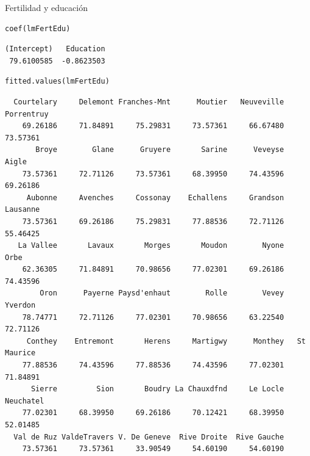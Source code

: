 \documentclass[xcolor={usenames,svgnames,dvipsnames}]{beamer}
\begin{document}
\begin{frame}[fragile,label=sec-5-2]{Fertilidad y educación}
 \lstset{language=R,label= ,caption= ,numbers=none}
\begin{lstlisting}
coef(lmFertEdu)
\end{lstlisting}

\begin{verbatim}
(Intercept)   Education 
 79.6100585  -0.8623503
\end{verbatim}

\lstset{language=R,label= ,caption= ,numbers=none}
\begin{lstlisting}
fitted.values(lmFertEdu)
\end{lstlisting}

\begin{verbatim}
  Courtelary     Delemont Franches-Mnt      Moutier   Neuveville   Porrentruy 
    69.26186     71.84891     75.29831     73.57361     66.67480     73.57361 
       Broye        Glane      Gruyere       Sarine      Veveyse        Aigle 
    73.57361     72.71126     73.57361     68.39950     74.43596     69.26186 
     Aubonne     Avenches     Cossonay    Echallens     Grandson     Lausanne 
    73.57361     69.26186     75.29831     77.88536     72.71126     55.46425 
   La Vallee       Lavaux       Morges       Moudon        Nyone         Orbe 
    62.36305     71.84891     70.98656     77.02301     69.26186     74.43596 
        Oron      Payerne Paysd'enhaut        Rolle        Vevey      Yverdon 
    78.74771     72.71126     77.02301     70.98656     63.22540     72.71126 
     Conthey    Entremont       Herens     Martigwy      Monthey   St Maurice 
    77.88536     74.43596     77.88536     74.43596     77.02301     71.84891 
      Sierre         Sion       Boudry La Chauxdfnd     Le Locle    Neuchatel 
    77.02301     68.39950     69.26186     70.12421     68.39950     52.01485 
  Val de Ruz ValdeTravers V. De Geneve  Rive Droite  Rive Gauche 
    73.57361     73.57361     33.90549     54.60190     54.60190
\end{verbatim}
\end{frame}
\end{document}
